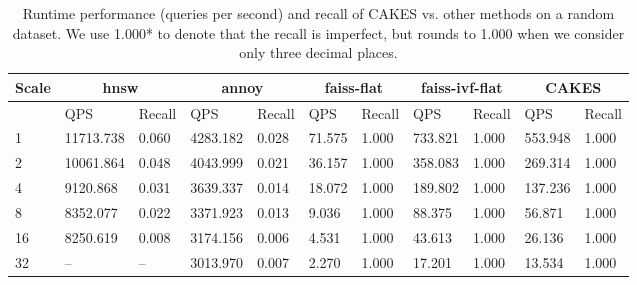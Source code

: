 \begin{table}[!t]
    \caption{Runtime performance (queries per second) and recall of CAKES vs. other methods on a random dataset. We use 1.000* to denote that the recall is imperfect, but rounds to 1.000 when we consider only three decimal places.}
    \label{table:results:ann-fashion}
    \vskip 0.15in
    \begin{center}
        \begin{small}
            \begin{sc}
                \begin{tabular}{|l|p{1cm}|p{1cm}|p{1cm}|p{1cm}|p{1cm}|p{1cm}|p{1cm}|p{1cm}|p{1cm}|p{1cm}|}
                    \hline
                    \textbf{Scale}  & \multicolumn{2}{|c|}{\textbf{hnsw}}  & \multicolumn{2}{|c|}{\textbf{annoy}} & \multicolumn{2}{|c|}{\textbf{faiss-flat}} & \multicolumn{2}{|c|}{\textbf{faiss-ivf-flat}}  & \multicolumn{2}{|c|}{\textbf{CAKES}} \\
                    \hline
                    &             QPS & Recall        & QPS & Recall      & QPS & Recall       & QPS & Recall    & QPS & Recall    \\
                    \hline
                    1 & 11713.738 & 0.060 & 4283.182 & 0.028 & 71.575 & 1.000 & 733.821 & 1.000 & 553.948 & 1.000 \\
                    \hline
                    2 & 10061.864 & 0.048 & 4043.999 & 0.021 & 36.157 & 1.000 & 358.083 & 1.000 & 269.314 & 1.000 \\
                    \hline
                    4 & 9120.868 & 0.031 & 3639.337 & 0.014 & 18.072 & 1.000 & 189.802 & 1.000 & 137.236 & 1.000 \\
                    \hline
                    8 & 8352.077 & 0.022 & 3371.923 & 0.013 & 9.036 & 1.000 & 88.375 & 1.000 & 56.871 & 1.000 \\
                    \hline
                    16 & 8250.619 & 0.008 & 3174.156 & 0.006 & 4.531 & 1.000 & 43.613 & 1.000 & 26.136 & 1.000 \\
                    \hline
                    32 & -- & -- & 3013.970 & 0.007 & 2.270 & 1.000 & 17.201 & 1.000 & 13.534 & 1.000 \\
                    \hline
                \end{tabular}
            \end{sc}
        \end{small}
    \end{center}
    \vskip -0.1in
\end{table}

